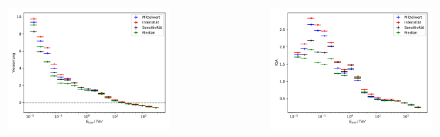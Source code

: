 \documentclass[aspectratio=1610, professionalfonts, 9pt]{beamer}
\begin{document}
  \begin{frame}
    \begin{columns}
      \begin{figure}
        \includegraphics[width=\textwidth]{pictures/RF_weights_bias.pdf}
        \caption{}
        \label{}
      \end{figure}
      \begin{figure}
        \includegraphics[width=\textwidth]{pictures/RF_weights_resolution.pdf}
        \caption{}
        \label{}
      \end{figure}
    \end{columns}
  \end{frame}
\end{document}
